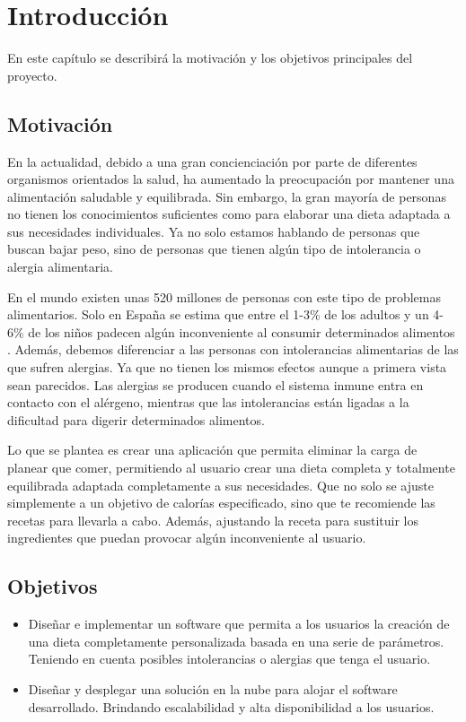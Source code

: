 \chapter{Introducción}
En este capítulo se describirá la motivación y los objetivos principales del proyecto.

\section{Motivación}
En la actualidad, debido a una gran concienciación por parte de diferentes organismos orientados la salud, ha aumentado la preocupación por mantener una alimentación saludable y equilibrada. Sin embargo, la gran mayoría de personas no tienen los conocimientos suficientes como para elaborar una dieta adaptada a sus necesidades individuales. Ya no solo estamos hablando de personas que buscan bajar peso, sino de personas que tienen algún tipo de intolerancia o alergia alimentaria. 

 En el mundo existen unas 520 millones de personas con este tipo de problemas alimentarios. Solo en España se estima que entre el 1-3\% de los adultos y un 4-6\% de los niños padecen algún inconveniente al consumir determinados alimentos \cite{alimentacion}. Además, debemos diferenciar a las personas con intolerancias alimentarias de las que sufren alergias. Ya que no tienen los mismos efectos aunque a primera vista sean parecidos. Las alergias se producen cuando el sistema inmune entra en contacto con el alérgeno, mientras que las intolerancias están ligadas a la dificultad para digerir determinados alimentos.

Lo que se plantea es crear una aplicación que permita eliminar la carga de planear que comer, permitiendo al usuario crear una dieta completa y totalmente equilibrada adaptada completamente a sus necesidades. Que no solo se ajuste simplemente a un objetivo de calorías especificado, sino que te recomiende las recetas para llevarla a cabo. Además, ajustando la receta para sustituir los ingredientes que puedan provocar algún inconveniente al usuario.

\section{Objetivos}
\begin{itemize}
    \item Diseñar e implementar un software que permita a los usuarios la creación de una dieta completamente personalizada basada en una serie de parámetros. Teniendo en cuenta posibles intolerancias o alergias que tenga el usuario. 
    \item Diseñar y desplegar una solución en la nube para alojar el software desarrollado. Brindando escalabilidad y alta disponibilidad a los usuarios. 
\end{itemize}